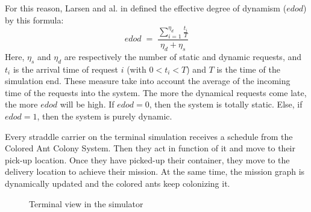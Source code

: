 \documentclass[journal]{IEEEtran}
\let\MYoriglatexcaption\caption
\renewcommand{\caption}[2][\relax]{\MYoriglatexcaption[#2]{#2}}
\begin{document}
For this reason, Larsen and al. in \cite{larsen00} defined the effective degree
of dynamism ($edod$) by this formula: \\
\begin{equation}
	edod\;=\; \frac{\sum_{i=1}^{\eta_d}\frac{t_i}{T}}{\eta_d+\eta_s}
\end{equation}
Here, $\eta_s$ and $\eta_d$ are respectively the number of static and dynamic
requests, and $t_i$ is the arrival time of request $i$ (with $0 < t_i < T $) and $T$ is the time of
the simulation end. These measure take into account the average of the incoming
time of the requests into the system. The more the dynamical requests come late,
the more $edod$ will be high. If $edod=0$, then the system is totally static.
Else, if $edod = 1$, then the system is purely dynamic.


Every straddle carrier on the terminal simulation receives a schedule from the
Colored Ant Colony System. Then they act in function of it and move to their
pick-up location. Once they have picked-up their container, they move to the
delivery location to achieve their mission. At the same time, the mission graph
is dynamically updated and the colored ants keep colonizing it.\\

\begin{figure}
\caption{Terminal view in the simulator}
\label{tview}
\end{figure}
\end{document}

